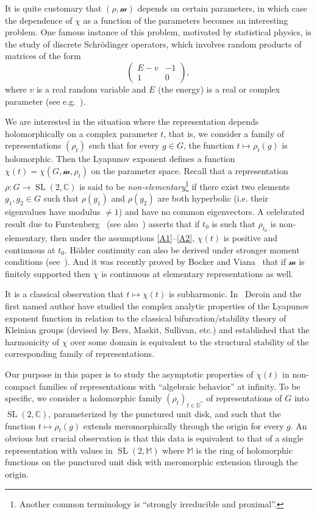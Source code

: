 \documentclass[11pt]{article}
\theoremstyle{definition}
\numberwithin{equation}{section}
\numberwithin{figure}{section}
\numberwithin{table}{section}
\DeclareMathOperator{\SL}{SL}
\newcommand{\dD}{\mathbb{D}}
\newcommand{\sm}{\mathcal{m}}
\newcommand{\mm}{\mathbb{M}}
\newcommand{\SLC}{\SL(2,\mathbb C)}
\begin{document}
It is quite customary that $(\rho, \sm)$ depends on certain parameters, in which case the dependence of $\chi$ as a function of the parameters becomes an interesting problem. One famous instance of this problem, motivated by statistical physics, is the study of discrete Schr\"odinger operators, which involves random products of matrices of the form
\[
\begin{pmatrix} E-v & -1 \\ 1 & 0
\end{pmatrix},
\]
where $v$ is a real random variable and $E$ (the energy) is a real or complex parameter
(see e.g.~\cite{bougerol-lacroix}).


We are interested in the situation where the representation depends holomorphically on a complex parameter $t$, that is, we consider a family of representations $(\rho_t)$ such that for every $g\in G$, the function $t\mapsto \rho_t(g)$ is holomorphic. Then the Lyapunov exponent defines a function $\chi(t) = \chi(G, \sm, \rho_t)$ on the parameter space. Recall that a representation $\rho: G \to \SLC$ is said to be \emph{non-elementary}\footnote{Another common terminology is ``strongly irreducible and proximal''.} if there exist two elements $g_1, g_2 \in G$ such that $\rho(g_1)$ and $\rho(g_2)$ are both hyperbolic (i.e. their eigenvalues have modulus $\neq 1$) and have no common eigenvectors. A celebrated result due to Furstenberg~\cite{furstenberg} (see also~\cite{furstenberg-kifer}) asserts that if $t_0$ is such that $\rho_{t_0}$ is non-elementary, then under the assumptions \eqref{A1}--\eqref{A2}, $\chi(t)$ is positive and continuous at $t_0$. H\"older continuity can also be derived under stronger moment conditions (see~\cite{lepage-holder}). And it was recently proved by Bocker and Viana~\cite{bocker-viana} that if $\sm$ is finitely supported then $\chi$ is continuous at elementary representations as well.

It is a classical observation that $t\mapsto \chi(t)$ is subharmonic. In~\cite{kleinbif, bers1} Deroin and the first named author have studied the complex analytic properties of the Lyapunov exponent function in relation to the classical bifurcation/stability theory of Kleinian groups (devised by Bers, Maskit, Sullivan, etc.) and established that the harmonicity of $\chi$ over some domain is equivalent to the structural stability of the corresponding family of representations.


Our purpose in this paper is to study the asymptotic properties of $\chi(t)$ in non-compact families of representations with ``algebraic behavior'' at infinity. To be specific, we consider a holomorphic family $(\rho_t)_{t\in \dD^*}$ of representations of $G$ into $\SLC$, parameterized by the punctured unit disk, and such that the function $t\mapsto \rho_t(g)$ extends meromorphically through the origin for every $g$. An obvious but crucial observation is that this data is equivalent to that of a single representation with values in $\SL(2, \mm)$ where $\mm$ is the ring of holomorphic functions on the punctured unit disk with meromorphic extension through the origin.
\end{document}
